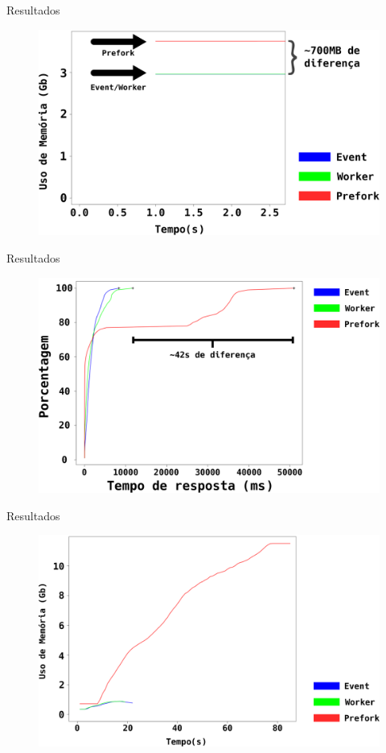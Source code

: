 \documentclass[xcolor={usenames,svgnames,dvipsnames},brazil,english,12pt,aspectratio=149]{beamer}
\begin{document}
\begin{frame}{Resultados}
  \begin{figure}[!h]
    \centering
    \includegraphics[width=.7\textwidth]{static_file_memory_usage}
  \end{figure}
\end{frame}

\begin{frame}{Resultados}
  \begin{figure}[!h]
    \centering
    \includegraphics[width=.8\textwidth]{dynamic_file_request_time}
  \end{figure}
\end{frame}

\begin{frame}{Resultados}
  \begin{figure}[!h]
    \centering
    \includegraphics[width=.7\textwidth]{dynamic_file_memory_usage}
  \end{figure}
\end{frame}
\end{document}
